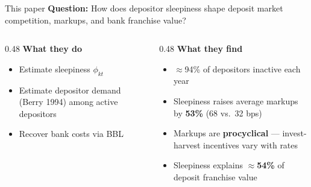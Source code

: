 \documentclass[10pt,aspectratio=169]{beamer}
\begin{document}
\begin{frame}{This paper}
\textbf{Question:} How does depositor sleepiness shape deposit market competition, markups, and bank franchise value?

\medskip
\begin{columns}[T]
\begin{column}{0.48\textwidth}
    \textbf{What they do}
    \begin{itemize}
        \item[\textbf{1.}] Estimate sleepiness $\phi_{kt}$ 
        \item[\textbf{2.}] Estimate depositor demand (Berry 1994) among active depositors
        \item[\textbf{3.}] Recover bank costs via BBL 
    \end{itemize}
\end{column}
\begin{column}{0.48\textwidth}
    \textbf{What they find}
    \begin{itemize}
        \item $\approx$94\% of depositors inactive each year
        \item Sleepiness raises average markups by \textbf{53\%} (68 vs.\ 32 bps)
        \item Markups are \textbf{procyclical} --- invest-harvest incentives vary with rates
        \item Sleepiness explains $\approx$\textbf{54\%} of deposit franchise value
    \end{itemize}
\end{column}
\end{columns}
\end{frame}
\end{document}

